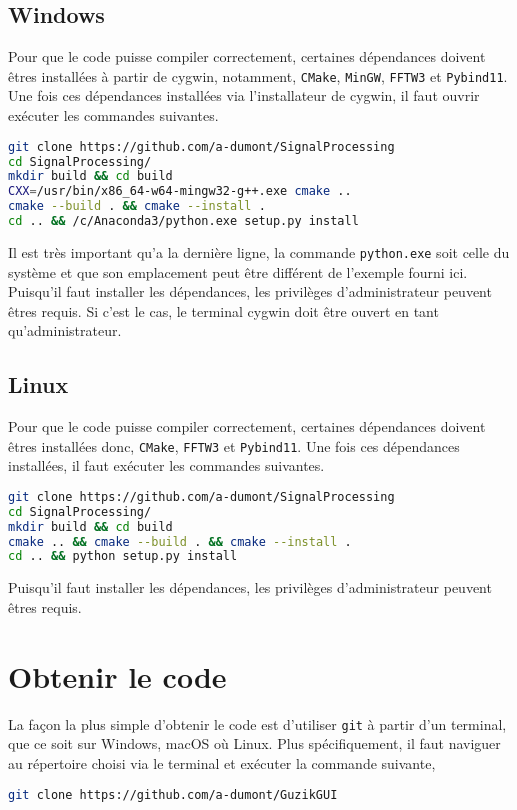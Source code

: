 \documentclass[openright,letterpaper,12pt]{book}
\begin{document}
\subsection*{Windows}
Pour que le code puisse compiler correctement, certaines dépendances doivent 
êtres installées à partir de cygwin, notamment, \verb+CMake+, \verb+MinGW+, 
\verb+FFTW3+ et \verb+Pybind11+. 
Une fois ces dépendances installées via l'installateur de cygwin, il faut 
ouvrir
exécuter les commandes suivantes.
\begin{lstlisting}[language=Bash]
git clone https://github.com/a-dumont/SignalProcessing
cd SignalProcessing/
mkdir build && cd build
CXX=/usr/bin/x86_64-w64-mingw32-g++.exe cmake .. 
cmake --build . && cmake --install .
cd .. && /c/Anaconda3/python.exe setup.py install
\end{lstlisting}
Il est très important qu'a la dernière ligne, la commande \verb+python.exe+ 
soit celle du système et que son emplacement peut être différent de l'exemple 
fourni ici.
Puisqu'il faut installer les dépendances, les privilèges d'administrateur 
peuvent êtres requis. 
Si c'est le cas, le terminal cygwin doit être ouvert en tant qu'administrateur.

\subsection*{Linux}
Pour que le code puisse compiler correctement, certaines dépendances doivent 
êtres installées donc, \verb+CMake+, \verb+FFTW3+ et \verb+Pybind11+. 
Une fois ces dépendances installées, il faut 
exécuter les commandes suivantes.
\begin{lstlisting}[language=Bash]
git clone https://github.com/a-dumont/SignalProcessing
cd SignalProcessing/
mkdir build && cd build
cmake .. && cmake --build . && cmake --install .
cd .. && python setup.py install
\end{lstlisting}
Puisqu'il faut installer les dépendances, les privilèges d'administrateur 
peuvent êtres requis. 

\section*{Obtenir le code}
La façon la plus simple d'obtenir le code est d'utiliser \verb+git+ à partir 
d'un terminal, que ce soit sur Windows, macOS où Linux. 
Plus spécifiquement, il faut naviguer au répertoire choisi via le terminal et 
exécuter la commande suivante,

\begin{lstlisting}[language=Bash]
git clone https://github.com/a-dumont/GuzikGUI
\end{lstlisting}
\end{document}
